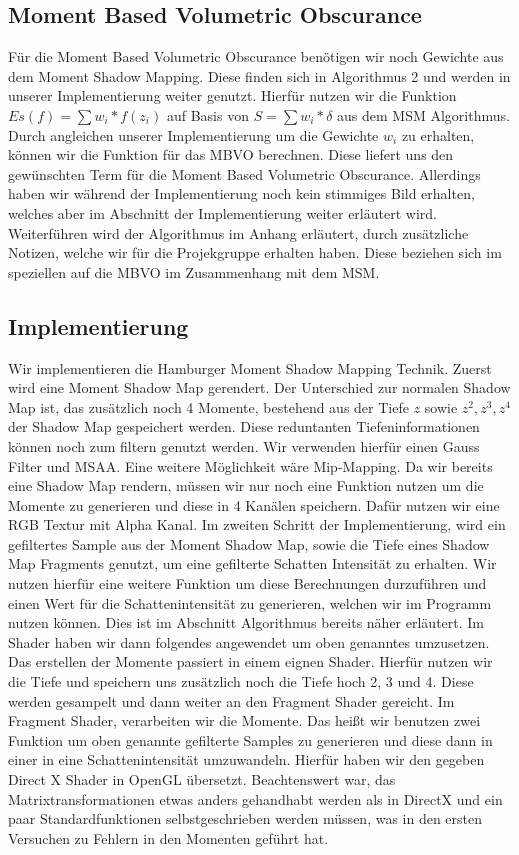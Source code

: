 \documentclass[runningheaders,a4paper]{llncs}
\begin{document}
\subsection{Moment Based Volumetric Obscurance}
Für die Moment Based Volumetric Obscurance benötigen wir noch Gewichte aus dem Moment Shadow Mapping. Diese finden sich in Algorithmus 2 und werden in unserer Implementierung weiter genutzt.
Hierfür nutzen wir die Funktion $Es(f) = \sum w_i*f(z_i)$ \cite{mbvo} auf Basis von $S = \sum w_i*\delta$ aus dem MSM Algorithmus. Durch angleichen unserer Implementierung um die Gewichte $w_i$ zu erhalten, können wir die Funktion für das MBVO berechnen. Diese liefert uns den gewünschten Term für die Moment Based Volumetric Obscurance. Allerdings haben wir während der Implementierung noch kein stimmiges Bild erhalten, welches aber im Abschnitt der Implementierung weiter erläutert wird. Weiterführen wird der Algorithmus im Anhang erläutert, durch zusätzliche Notizen, welche wir für die Projekgruppe erhalten haben. Diese beziehen sich im speziellen auf die MBVO im Zusammenhang mit dem MSM.\cite{mbvo}

\subsection{Implementierung}

Wir implementieren die Hamburger Moment Shadow Mapping Technik. 
Zuerst wird eine Moment Shadow Map gerendert. Der Unterschied zur normalen Shadow Map ist, das zusätzlich noch 4 Momente, bestehend aus der Tiefe $z$ sowie $z^2,z^3,z^4$ der Shadow Map gespeichert werden. Diese reduntanten Tiefeninformationen können noch zum filtern genutzt werden. Wir verwenden hierfür einen Gauss Filter und MSAA. Eine weitere Möglichkeit wäre Mip-Mapping. Da wir bereits eine Shadow Map rendern, müssen wir nur noch eine Funktion nutzen um die Momente zu generieren und diese in 4 Kanälen speichern. Dafür nutzen wir eine RGB Textur mit Alpha Kanal.
Im zweiten Schritt der Implementierung, wird ein gefiltertes Sample aus der Moment Shadow Map, sowie die Tiefe eines Shadow Map Fragments genutzt, um eine gefilterte Schatten Intensität zu erhalten.
Wir nutzen hierfür eine weitere Funktion um diese Berechnungen durzuführen und einen Wert für die Schattenintensität zu generieren, welchen wir im Programm nutzen können. Dies ist im Abschnitt Algorithmus bereits näher erläutert.
Im Shader haben wir dann folgendes angewendet um oben genanntes umzusetzen.
Das erstellen der Momente passiert in einem eignen Shader. Hierfür nutzen wir die Tiefe und speichern uns zusätzlich noch die Tiefe hoch 2, 3 und 4. Diese werden gesampelt und dann weiter an den Fragment Shader gereicht.
Im Fragment Shader, verarbeiten wir die Momente. Das heißt wir benutzen zwei Funktion um oben genannte gefilterte Samples zu generieren und diese dann in einer in eine Schattenintensität umzuwandeln. Hierfür haben wir den gegeben Direct X Shader in OpenGL übersetzt. Beachtenswert war, das Matrixtransformationen etwas anders gehandhabt werden als in DirectX und ein paar Standardfunktionen selbstgeschrieben werden müssen, was in den ersten Versuchen zu Fehlern in den Momenten geführt hat.
\end{document}
